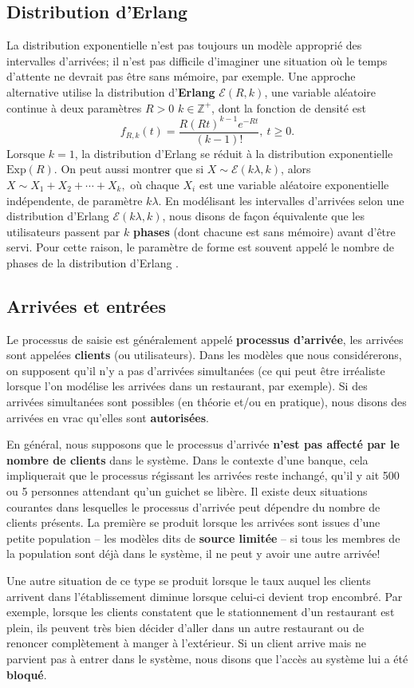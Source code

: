 \subsection{Distribution d'Erlang}
La distribution exponentielle n'est pas toujours un mo\-dè\-le approprié des intervalles d’arrivées; il n’est pas difficile d’imaginer une situation où le temps d’attente ne devrait pas être sans mémoire, par exemple. Une approche alternative utilise la distribution d'\textbf{Erlang} $\mathcal{E}(R,k)$, une variable aléatoire continue à deux paramètres $R>0$  $k\in \mathbb{Z}^+$,  dont la fonction de densité est  
$$ f_{R,k}(t) = \frac{R (Rt)^{k-1} e^{-Rt}}{(k-1)!},\ t\geq 0.$$
Lorsque $k=1$, la distribution d'Erlang se réduit à la distribution exponentielle $\text{Exp}(R)$. On peut aussi montrer que si $X\sim \mathcal{E}(k\lambda,k)$, alors $X\sim X_{1}+X_{2}+\cdots+X_{k},$ où chaque $X_{i}$ est une variable aléatoire exponentielle indépendente, de paramètre $k \lambda$. \newl En modélisant les intervalles d’arrivées selon une distribution d’Erlang $\mathcal{E}(k\lambda,k)$, nous disons de façon équivalente que les utilisateurs passent par $k$ \textbf{phases} (dont chacune est sans mémoire) avant d'être servi. Pour cette raison, le paramètre de forme est souvent appelé le nombre de phases de la distribution d'Erlang \cite{QS_N}.
\subsection{Arrivées et entrées}
Le processus de saisie est généralement appelé \textbf{processus d’arrivée}, les arrivées sont appelées \textbf{clients} (ou utilisateurs). Dans les modèles que nous considérerons, on supposent qu’il n’y a pas d'arrivées simultanées (ce qui peut être irréaliste lorsque l'on modélise les arrivées dans un restaurant, par exemple). Si des arrivées simultanées sont possibles (en théorie et/ou en pratique), nous disons des arrivées en vrac qu'elles sont \textbf{autorisées}. 
\par En général, nous supposons que le processus d'arrivée \textbf{n’est pas affecté par le nombre de clients} dans le système. Dans le contexte d'une banque, cela impliquerait que le processus régissant les arrivées reste inchangé, qu'il y ait 500 ou 5 personnes attendant qu’un guichet se libère. 
\newl Il existe deux situations courantes dans lesquelles le processus d'arrivée peut dépendre du nombre de clients présents. La première se produit lorsque les arrivées sont issues d'une petite population -- les modèles dits de \textbf{source limitée} -- si tous les membres de la population sont déjà dans le système, il ne peut y avoir une autre arrivée!\par Une autre situation de ce type se produit lorsque le taux auquel les clients arrivent dans l'établissement diminue lorsque celui-ci devient trop encombré. Par exemple, lorsque les clients constatent que le stationnement d'un restaurant est plein, ils peuvent très bien décider d'aller dans un autre restaurant ou de renoncer complètement à manger à l'extérieur. Si un client arrive mais ne parvient pas à entrer dans le système, nous disons que l'accès au système lui a été \textbf{bloqué}.
